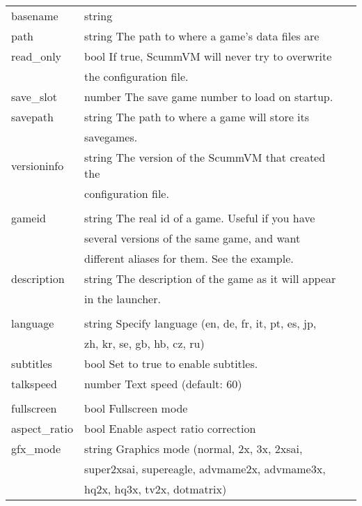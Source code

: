 \begin{tabular}[hf]{lll}
        basename       &string\\
        path           &string   The path to where a game's data files are\\
        read\_only     &bool     If true, ScummVM will never try to overwrite\\
                       &         the configuration file.\\
        save\_slot     &number   The save game number to load on startup.\\
        savepath       &string   The path to where a game will store its\\
                       &         savegames.\\
        versioninfo    &string   The version of the ScummVM that created the\\
                       &         configuration file.\\
\\
        gameid         &string   The real id of a game. Useful if you have\\
                       &         several versions of the same game, and want\\
                       &         different aliases for them. See the example.\\
        description    &string   The description of the game as it will appear\\
                       &         in the launcher.\\
\\
        language       &string   Specify language (en, de, fr, it, pt, es, jp,\\
                       &         zh, kr, se, gb, hb, cz, ru)\\
        subtitles      &bool     Set to true to enable subtitles.\\
        talkspeed      &number   Text speed (default: 60)\\
\\
        fullscreen     &bool     Fullscreen mode\\
        aspect\_ratio  &bool     Enable aspect ratio correction\\
        gfx\_mode      &string   Graphics mode (normal, 2x, 3x, 2xsai,\\
                       &         super2xsai, supereagle, advmame2x, advmame3x,\\
                       &         hq2x, hq3x, tv2x, dotmatrix)\\

\end{tabular}
